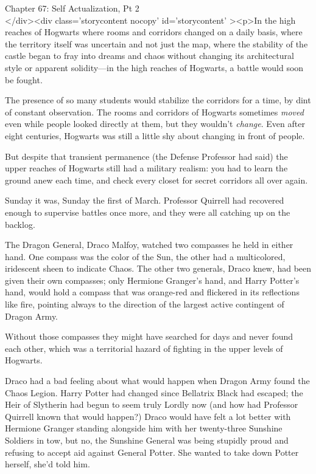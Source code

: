 
Chapter 67: Self Actualization, Pt 2\\
</div><div  class='storycontent nocopy' id='storycontent' ><p>In the high 
reaches of Hogwarts where rooms and corridors changed on a daily basis, where 
the territory itself was uncertain and not just the map, where the stability of 
the castle began to fray into dreams and chaos without changing its 
architectural style or apparent solidity---in the high reaches of Hogwarts, a 
battle would soon be fought.

The presence of so many students would stabilize the corridors for a time, by 
dint of constant observation. The rooms and corridors of Hogwarts sometimes 
\emph{moved} even while people looked directly at them, but they wouldn't 
\emph{change}. Even after eight centuries, Hogwarts was still a little shy 
about changing in front of people.

But despite that transient permanence (the Defense Professor had said) the 
upper reaches of Hogwarts still had a military realism: you had to learn the 
ground anew each time, and check every closet for secret corridors all over 
again.

Sunday it was, Sunday the first of March. Professor Quirrell had recovered 
enough to supervise battles once more, and they were all catching up on the 
backlog.

The Dragon General, Draco Malfoy, watched two compasses he held in either hand. 
One compass was the color of the Sun, the other had a multicolored, iridescent 
sheen to indicate Chaos. The other two generals, Draco knew, had been given 
their own compasses; only Hermione Granger's hand, and Harry Potter's hand, 
would hold a compass that was orange-red and flickered in its reflections like 
fire, pointing always to the direction of the largest active contingent of 
Dragon Army.

Without those compasses they might have searched for days and never found each 
other, which was a territorial hazard of fighting in the upper levels of 
Hogwarts.

Draco had a bad feeling about what would happen when Dragon Army found the 
Chaos Legion. Harry Potter had changed since Bellatrix Black had escaped; the 
Heir of Slytherin had begun to seem truly Lordly now (and how had Professor 
Quirrell known that would happen?) Draco would have felt a lot better with 
Hermione Granger standing alongside him with her twenty-three Sunshine Soldiers 
in tow, but no, the Sunshine General was being stupidly proud and refusing to 
accept aid against General Potter. She wanted to take down Potter herself, 
she'd told him.

